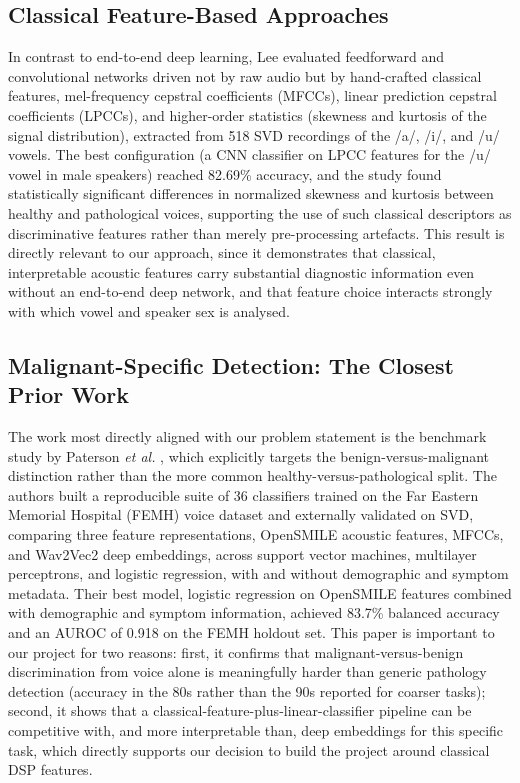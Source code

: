 \documentclass[conference]{IEEEtran}
\begin{document}
\subsection{Classical Feature-Based Approaches}
In contrast to end-to-end deep learning, Lee \cite{lee2021} evaluated feedforward and convolutional networks driven not by raw audio but by hand-crafted classical features, mel-frequency cepstral coefficients (MFCCs), linear prediction cepstral coefficients (LPCCs), and higher-order statistics (skewness and kurtosis of the signal distribution), extracted from 518 SVD recordings of the /a/, /i/, and /u/ vowels. The best configuration (a CNN classifier on LPCC features for the /u/ vowel in male speakers) reached 82.69\% accuracy, and the study found statistically significant differences in normalized skewness and kurtosis between healthy and pathological voices, supporting the use of such classical descriptors as discriminative features rather than merely pre-processing artefacts. This result is directly relevant to our approach, since it demonstrates that classical, interpretable acoustic features carry substantial diagnostic information even without an end-to-end deep network, and that feature choice interacts strongly with which vowel and speaker sex is analysed.

\subsection{Malignant-Specific Detection: The Closest Prior Work}
The work most directly aligned with our problem statement is the benchmark study by Paterson \emph{et al.} \cite{paterson2024}, which explicitly targets the benign-versus-malignant distinction rather than the more common healthy-versus-pathological split. The authors built a reproducible suite of 36 classifiers trained on the Far Eastern Memorial Hospital (FEMH) voice dataset and externally validated on SVD, comparing three feature representations, OpenSMILE acoustic features, MFCCs, and Wav2Vec2 deep embeddings, across support vector machines, multilayer perceptrons, and logistic regression, with and without demographic and symptom metadata. Their best model, logistic regression on OpenSMILE features combined with demographic and symptom information, achieved 83.7\% balanced accuracy and an AUROC of 0.918 on the FEMH holdout set. This paper is important to our project for two reasons: first, it confirms that malignant-versus-benign discrimination from voice alone is meaningfully harder than generic pathology detection (accuracy in the 80s rather than the 90s reported for coarser tasks); second, it shows that a classical-feature-plus-linear-classifier pipeline can be competitive with, and more interpretable than, deep embeddings for this specific task, which directly supports our decision to build the project around classical DSP features.
\end{document}
